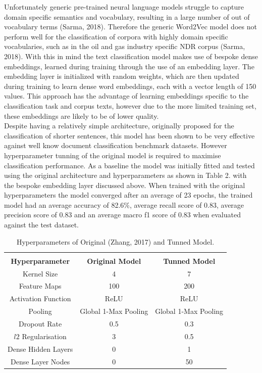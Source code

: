\documentclass[a4paper,12pt]{article}
\begin{document}
Unfortunately generic pre-trained neural language models struggle to capture domain specific semantics and vocabulary, resulting in a  large number of out of vocabulary terms (Sarma, 2018). Therefore the generic Word2Vec model does not perform well for the classification of corpora with highly domain specific vocabularies, such as in the oil and gas industry specific NDR corpus (Sarma, 2018). With this in mind the text classification model makes use of bespoke dense embeddings, learned during training through the use of an embedding layer. The embedding layer is initialized with random weights, which are then updated during training to learn dense word embeddings, each with a vector length of 150 values. This approach has the advantage of learning embeddings specific to the classification task and corpus texts, however due to the more limited training set, these embeddings are likely to be of lower quality.\\

Despite having a relatively simple architecture, originally proposed for the classification of shorter sentences, this model has been shown to be very effective against well know document classification benchmark datasets. However hyperparameter tunning of the original model is required to maximise classification performance. As a baseline the model was initially fitted and tested using the original architecture and hyperparameters as shown in Table 2. with the bespoke embedding layer discussed above. When trained with the original hyperparameters the model converged after an average of 23 epochs, the trained model had an average accuracy of 82.6\%, average recall score of 0.83, average precision score of 0.83 and an average macro f1 score of 0.83 when evaluated against the test dataset.\\

\begin{table}[H]
	\centering
	\begin{tabular}{| c | c | c |}
	\hline
	&&\\
	\textbf{Hyperparameter} & \textbf{Original Model} & \textbf{Tunned Model}\\
	\hline
	Kernel Size & 4 & 7\\
	\hline
	Feature Maps & 100 & 200\\
	\hline
	Activation Function & ReLU & ReLU\\
	\hline
	Pooling & Global 1-Max Pooling & Global 1-Max Pooling\\
	\hline
	Dropout Rate & 0.5 & 0.3 \\
	\hline
	$l2$ Regularisation & 3 & 0.5\\
	\hline
	Dense Hidden Layers & 0 & 1\\
	\hline
	Dense Layer Nodes & 0 & 50\\
	\hline
	\end{tabular}
	\caption{\label{tab:table-name}Hyperparameters of Original (Zhang, 2017) and Tunned Model.}
\end{table}
\end{document}
